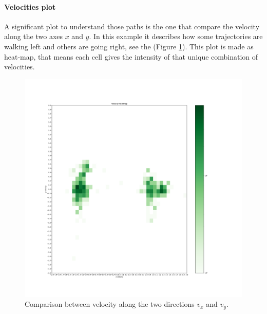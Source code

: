\documentclass[class=article, crop=false]{standalone}
\begin{document}
\paragraph{Velocities plot}
A significant plot to understand those paths is the one that compare the velocity along the two axes $x$ and $y$.
In this example it describes how some trajectories are walking left and others are going right, see the (Figure \ref{fig:5pids_velhist}).
This plot is made as heat-map, that means each cell gives the intensity of that unique combination of velocities.
\begin{figure}[h]
\centering
\includegraphics[scale=0.18]{fig/5pids/figure_trainf10_few_trajectories_Dx200_Dy100_VELHIST}
\captionsetup{width=.5\linewidth}
\caption{Comparison between velocity along the two directions $v_x$ and $v_y$.}
\label{fig:5pids_velhist}
\end{figure}
\end{document}
